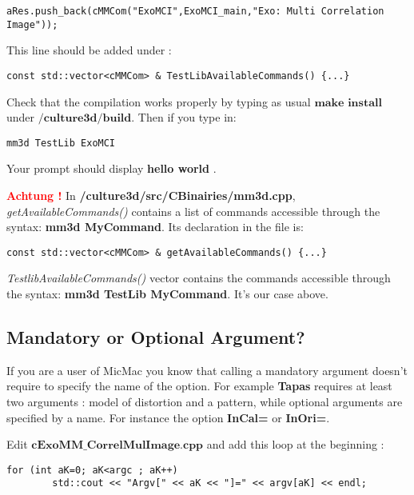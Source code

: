 \begin{verbatim}
aRes.push_back(cMMCom("ExoMCI",ExoMCI_main,"Exo: Multi Correlation Image"));
\end{verbatim}

This line should be added under : \newline
\begin{verbatim}
const std::vector<cMMCom> & TestLibAvailableCommands() {...}
\end{verbatim}

Check that the compilation works properly by typing as usual $\textbf{make install}$ under \og$\textbf{/culture3d/build}$\fg. Then if you type in:

\begin{verbatim}
mm3d TestLib ExoMCI
\end{verbatim}
Your prompt should display \og \textbf{hello world} \fg.\newline

 \textbf{\textcolor{red}{Achtung !}} In \textbf{/culture3d/src/CBinairies/mm3d.cpp},  \textit{getAvailableCommands()} contains a list of commands accessible through the syntax: \textbf{mm3d MyCommand}. Its declaration in the file is:
\begin{verbatim}
const std::vector<cMMCom> & getAvailableCommands() {...}
\end{verbatim}

\textit{TestlibAvailableCommands()} vector contains the commands accessible through the syntax: \textbf{mm3d TestLib MyCommand}. It's our case above.

\subsection{Mandatory or Optional Argument?}
If you are a user of MicMac you know that calling a mandatory argument doesn't require to specify the name of the option. For example \textbf{Tapas} requires at least two arguments : model of distortion and a pattern, while optional arguments are specified by a name. For instance the option \textbf{InCal=} or \textbf{InOri=}.\newline


Edit $\textbf{cExoMM\_CorrelMulImage.cpp}$ and add this loop at the beginning :\newline

\begin{verbatim}
for (int aK=0; aK<argc ; aK++)
        std::cout << "Argv[" << aK << "]=" << argv[aK] << endl;
\end{verbatim}

